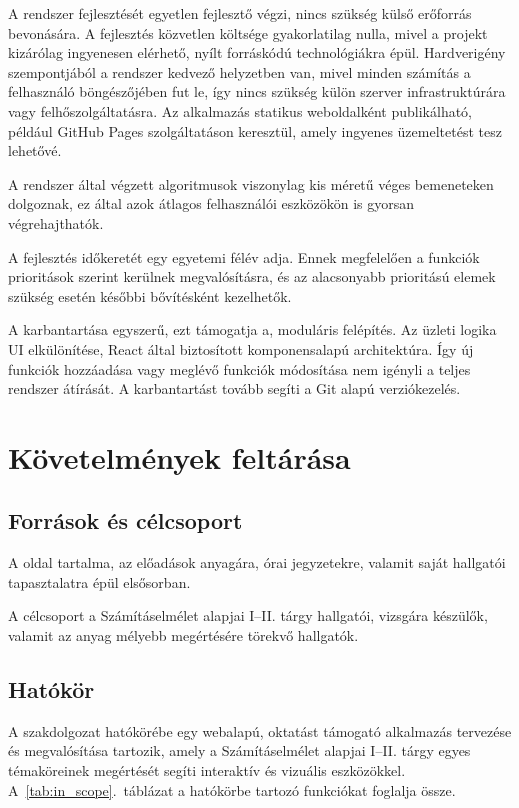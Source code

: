 \documentclass[12pt,a4paper]{report}
\begin{document}
A rendszer fejlesztését egyetlen fejlesztő végzi, nincs szükség külső erőforrás bevonására.
 A fejlesztés közvetlen költsége gyakorlatilag nulla, mivel a projekt kizárólag ingyenesen elérhető,
nyílt forráskódú technológiákra épül.
Hardverigény szempontjából a rendszer kedvező helyzetben van, mivel minden számítás a felhasználó
böngészőjében fut le, így nincs szükség külön szerver infrastruktúrára vagy felhőszolgáltatásra.
Az alkalmazás statikus weboldalként publikálható, például GitHub Pages szolgáltatáson keresztül,
amely ingyenes üzemeltetést tesz lehetővé.

A rendszer által végzett algoritmusok viszonylag kis méretű véges bemeneteken dolgoznak, ez által
 azok átlagos felhasználói eszközökön is gyorsan végrehajthatók.

A fejlesztés időkeretét egy egyetemi félév adja. Ennek megfelelően a funkciók prioritások szerint 
kerülnek megvalósításra, és az alacsonyabb prioritású elemek szükség esetén későbbi bővítésként kezelhetők.

A karbantartása egyszerű, ezt támogatja a, moduláris felépítés. 
Az üzleti logika  UI elkülönítése, React által biztosított komponensalapú architektúra. 
Így új funkciók hozzáadása vagy meglévő funkciók módosítása nem igényli a teljes rendszer
átírását. A karbantartást tovább segíti a Git alapú verziókezelés.

\section{Követelmények feltárása}

\subsection{Források és célcsoport}
A oldal tartalma, az előadások anyagára, órai jegyzetekre, valamit saját hallgatói tapasztalatra épül elsősorban.

 A célcsoport a Számításelmélet alapjai I--II. tárgy hallgatói, vizsgára készülők, 
 valamit az anyag mélyebb megértésére törekvő hallgatók.

\subsection{Hatókör}
A szakdolgozat hatókörébe egy webalapú, oktatást támogató alkalmazás
tervezése és megvalósítása tartozik, amely a Számításelmélet
alapjai I--II. tárgy egyes témaköreinek megértését segíti interaktív
és vizuális eszközökkel. A~\ref{tab:in_scope}.~táblázat a hatókörbe
tartozó funkciókat foglalja össze.
\end{document}
